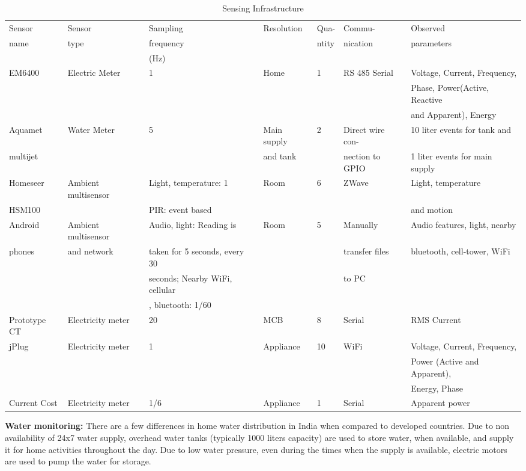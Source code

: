 \documentclass[10pt]{sensys-proc}
\begin{document}
\begin{table}[t!]

\caption{Sensing Infrastructure}
\vspace{-3mm}
\label{tab:sensing}
\tabcolsep=0.015cm
\begin{tabular}{|l|l|l|l|l|l|l|}
\hline
Sensor&Sensor&Sampling&Resolution&Qua-&Commu-&Observed\\
name&type&frequency&&ntity&nication&parameters\\
&&(Hz)&&&&\\
\hline

EM6400&Electric Meter&1&Home&1&RS 485 Serial&Voltage, Current, Frequency,\\ 
&&&&&&Phase, Power(Active, Reactive \\ 
&&&&&&and Apparent), Energy\\ \hline
Aquamet &Water Meter&5&Main supply&2&Direct wire con-&10 liter events for tank and \\ 
multijet&&& and tank&&nection to GPIO&1 liter events for main supply\\ \hline
Homeseer &Ambient multisensor&Light, temperature: 1&Room &6&ZWave&Light, temperature\\ 
     HSM100           &&PIR: event based&&&& and motion\\ \hline
Android&Ambient multisensor&Audio, light: Reading is &Room&5&Manually&Audio features, light, nearby \\ 
phones&and network&taken for 5 seconds, every 30 &&&transfer files&bluetooth, cell-tower, WiFi\\ 
&&seconds; Nearby WiFi, cellular&&&to PC&\\ 
&&, bluetooth: 1/60&&&&\\ \hline
Prototype CT&Electricity meter&20&MCB&8&Serial&RMS Current \\\hline
jPlug&Electricity meter & 1 &Appliance&10&WiFi&Voltage, Current, Frequency,\\ 
&&&&&&Power (Active and Apparent),\\
&&&&&& Energy, Phase\\ \hline	
Current Cost&Electricity meter&1/6&Appliance&1&Serial&Apparent power\\ \hline


\end{tabular}


\end{table}
\noindent \textbf{Water monitoring:} There are a few differences in home water distribution in India when compared to developed countries. Due to non availability of 24x7 water supply, overhead water tanks (typically 1000 liters capacity) are used to store water, when available, and supply it for home activities throughout the day. Due to low water pressure, even during the times when the supply is available, electric motors are used to pump the water for storage. %
\end{document}
